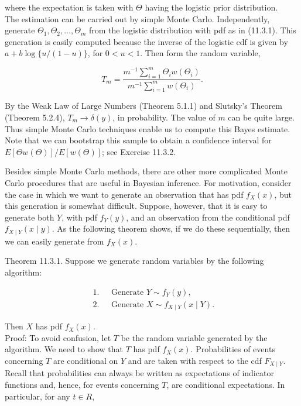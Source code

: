 where the expectation is taken with $\Theta$ having the logistic prior distribution.\\
The estimation can be carried out by simple Monte Carlo. Independently, generate $\Theta_{1}, \Theta_{2}, \ldots, \Theta_{m}$ from the logistic distribution with pdf as in (11.3.1). This generation is easily computed because the inverse of the logistic cdf is given by $a+b \log \{u /(1-u)\}$, for $0<u<1$. Then form the random variable,


\begin{equation*}
T_{m}=\frac{m^{-1} \sum_{i=1}^{m} \Theta_{i} w\left(\Theta_{i}\right)}{m^{-1} \sum_{i=1}^{m} w\left(\Theta_{i}\right)} . \tag{11.3.3}
\end{equation*}


By the Weak Law of Large Numbers (Theorem 5.1.1) and Slutsky's Theorem (Theorem 5.2.4), $T_{m} \rightarrow \delta(y)$, in probability. The value of $m$ can be quite large. Thus simple Monte Carlo techniques enable us to compute this Bayes estimate. Note that we can bootstrap this sample to obtain a confidence interval for $E[\Theta w(\Theta)] / E[w(\Theta)]$; see Exercise 11.3.2.

Besides simple Monte Carlo methods, there are other more complicated Monte Carlo procedures that are useful in Bayesian inference. For motivation, consider the case in which we want to generate an observation that has pdf $f_{X}(x)$, but this generation is somewhat difficult. Suppose, however, that it is easy to generate both $Y$, with pdf $f_{Y}(y)$, and an observation from the conditional pdf $f_{X \mid Y}(x \mid y)$. As the following theorem shows, if we do these sequentially, then we can easily generate from $f_{X}(x)$.

Theorem 11.3.1. Suppose we generate random variables by the following algorithm:

$$
\begin{array}{ll}
\text { 1. } & \text { Generate } Y \sim f_{Y}(y), \\
\text { 2. } & \text { Generate } X \sim f_{X \mid Y}(x \mid Y) .
\end{array}
$$

Then $X$ has pdf $f_{X}(x)$.\\
Proof: To avoid confusion, let $T$ be the random variable generated by the algorithm. We need to show that $T$ has pdf $f_{X}(x)$. Probabilities of events concerning $T$ are conditional on $Y$ and are taken with respect to the cdf $F_{X \mid Y}$. Recall that probabilities can always be written as expectations of indicator functions and, hence, for events concerning $T$, are conditional expectations. In particular, for any $t \in R$,

